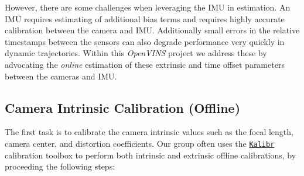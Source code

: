 However, there are some challenges when leveraging the I\+MU in estimation. An I\+MU requires estimating of additional bias terms and requires highly accurate calibration between the camera and I\+MU. Additionally small errors in the relative timestamps between the sensors can also degrade performance very quickly in dynamic trajectories. Within this {\itshape Open\+V\+I\+NS} project we address these by advocating the {\itshape online} estimation of these extrinsic and time offset parameters between the cameras and I\+MU.

\hypertarget{gs-calibration_gs-calib-cam-static}{}\subsection{Camera Intrinsic Calibration (\+Offline)}\label{gs-calibration_gs-calib-cam-static}
The first task is to calibrate the camera intrinsic values such as the focal length, camera center, and distortion coefficients. Our group often uses the \href{https://github.com/ethz-asl/kalibr/}{\tt Kalibr} \cite{Furgale2013IROS} calibration toolbox to perform both intrinsic and extrinsic offline calibrations, by proceeding the following steps\+:


